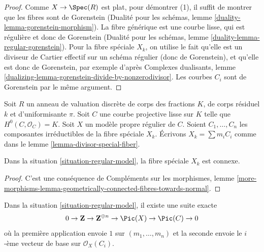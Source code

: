 \begin{proof}
Comme $X \to \Spec(R)$ est plat, pour démontrer (1),
il suffit de montrer que les fibres sont de Gorenstein
(Dualité pour les schémas, lemme \ref{duality-lemma-gorenstein-morphism}).
La fibre générique est une courbe lisse, qui est régulière et donc de Gorenstein
(Dualité pour les schémas, lemme \ref{duality-lemma-regular-gorenstein}).
Pour la fibre spéciale $X_k$, on utilise le fait qu'elle est un diviseur de
Cartier effectif sur un schéma régulier (donc de Gorenstein), et qu'elle est donc
de Gorenstein, par exemple d'après Complexes dualisants, lemme
\ref{dualizing-lemma-gorenstein-divide-by-nonzerodivisor}.
Les courbes $C_i$ sont de Gorenstein par le même argument.
\end{proof}

\begin{situation}
\label{situation-regular-model}
Soit $R$ un anneau de valuation discrète de corps des fractions $K$,
de corps résiduel $k$ et d'uniformisante $\pi$.
Soit $C$ une courbe projective lisse sur $K$ telle que $H^0(C, \mathcal{O}_C) = K$.
Soit $X$ un modèle propre régulier de $C$.
Soient $C_1, \ldots, C_n$ les composantes irréductibles de la fibre
spéciale $X_k$. Écrivons $X_k = \sum m_i C_i$ comme dans le
lemme \ref{lemma-divisor-special-fiber}.
\end{situation}

\begin{lemma}
\label{lemma-regular-model-connected}
Dans la situation \ref{situation-regular-model}, la fibre spéciale $X_k$ est connexe.
\end{lemma}

\begin{proof}
C'est une conséquence de Compléments sur les morphismes, lemme
\ref{more-morphisms-lemma-geometrically-connected-fibres-towards-normal}.
\end{proof}

\begin{lemma}
\label{lemma-regular-model-pic}
Dans la situation \ref{situation-regular-model}, il existe une suite exacte
$$
0 \to \mathbf{Z} \to \mathbf{Z}^{\oplus n} \to
\Pic(X) \to \Pic(C) \to 0
$$
où la première application envoie $1$ sur $(m_1, \ldots, m_n)$ et la seconde
envoie le $i$-ème vecteur de base sur $\mathcal{O}_X(C_i)$.
\end{lemma}


